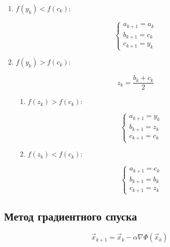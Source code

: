 \documentclass[10pt,a4paper]{article}
\begin{document}
			\begin{enumerate}
				\item $f\left(y_{k}\right) < f\left(c_{k}\right)$:
				
				\begin{equation}
					\begin{cases}
						a_{k + 1} = a_{k}
						\\
						b_{k + 1} = c_{k}
						\\
						c_{k + 1} = y_{k}
					\end{cases}
				\end{equation}
				
				\item $f\left(y_{k}\right) > f\left(c_{k}\right)$:
				
				\begin{equation}
					z_{k} = \frac{b_{k} + c_{k}}{2}
				\end{equation}
				\begin{enumerate}
					\item $f\left(z_{k}\right) > f\left(c_{k}\right)$:
					
					\begin{equation}
						\begin{cases}
							a_{k + 1} = y_{k}
							\\
							b_{k + 1} = z_{k}
							\\
							c_{k + 1} = c_{k}
						\end{cases}
					\end{equation}
					\item $f\left(z_{k}\right) < f\left(c_{k}\right)$:
					
					\begin{equation}
						\begin{cases}
							a_{k + 1} = c_{k}
							\\
							b_{k + 1} = b_{k}
							\\
							c_{k + 1} = z_{k}
						\end{cases}
					\end{equation}
				\end{enumerate}
			\end{enumerate}
		\subsection{Метод градиентного спуска}
		
		\begin{equation}
			\vec{x}_{k + 1} = \vec{x}_{k} - \alpha \nabla 
			\Phi\left(\vec{x}_{k}\right)
		\end{equation}
		
\end{document}

